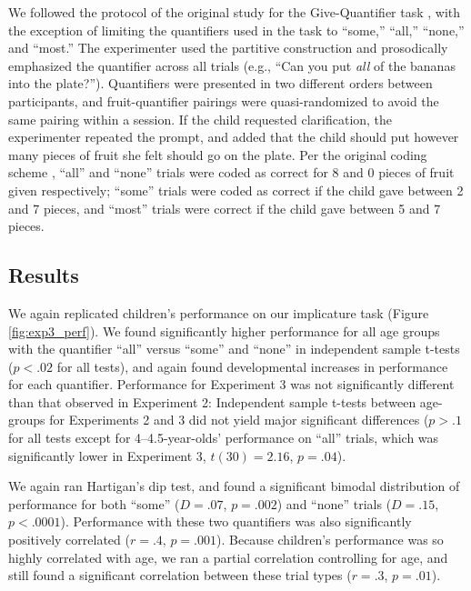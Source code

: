 \documentclass[man]{apa2}
\begin{document}
We followed the protocol of the original study for the Give-Quantifier task \cite{barner2009}, with the exception of limiting the quantifiers used in the task to ``some,'' ``all,'' ``none,'' and ``most.'' The experimenter used the partitive construction and prosodically emphasized the quantifier across all trials (e.g., ``Can you put \textit{all} of the bananas into the plate?''). Quantifiers were presented in two different orders between participants, and fruit-quantifier pairings were quasi-randomized to avoid the same pairing within a session. If the child requested clarification, the experimenter repeated the prompt, and added that the child should put however many pieces of fruit she felt should go on the plate. Per the original coding scheme \cite{barner2009}, ``all'' and ``none'' trials were coded as correct for 8 and 0 pieces of fruit given respectively; ``some'' trials were coded as correct if the child gave between 2 and 7 pieces, and ``most'' trials were correct if the child gave between 5 and 7 pieces.

\subsection{Results}

We again replicated children's performance on our implicature task (Figure \ref{fig:exp3_perf}). We found significantly higher performance for all age groups with the quantifier ``all'' versus ``some'' and ``none'' in independent sample t-tests ($p < .02$ for all tests), and again found developmental increases in performance for each quantifier. Performance for Experiment 3 was not significantly different than that observed in Experiment 2: Independent sample t-tests between age-groups for Experiments 2 and 3 did not yield major significant differences ($p > .1$ for all tests except for 4--4.5-year-olds' performance on ``all'' trials, which was significantly lower in Experiment 3, $t(30) = 2.16$, $p = .04$).

We again ran Hartigan's dip test, and found a significant bimodal distribution of performance for both ``some'' ($D = .07$, $p = .002$) and ``none'' trials ($D = .15$, $p < .0001$). Performance with these two quantifiers was also significantly positively correlated ($r = .4$, $p = .001$). Because children's performance was so highly correlated with age, we ran a partial correlation controlling for age, and still found a significant correlation between these trial types ($r = .3$, $p = .01$).
\end{document}
